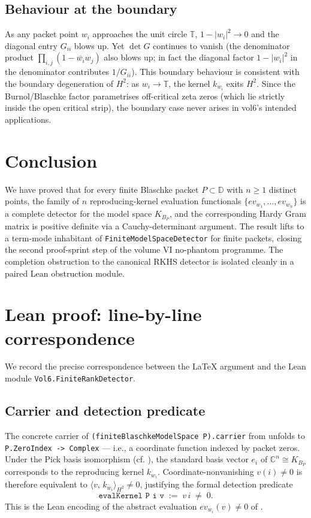 \documentclass[12pt]{article}
\theoremstyle{definition}
\theoremstyle{remark}
\newcommand{\C}{\mathbb{C}}
\newcommand{\D}{\mathbb{D}}
\newcommand{\T}{\mathbb{T}}
\newcommand{\HHH}{H^{2}}
\newcommand{\KBP}{K_{B_{P}}}
\newcommand{\inner}[2]{\langle #1,\,#2\rangle}
\newcommand{\abs}[1]{\lvert #1 \rvert}
\newcommand{\conj}[1]{\overline{#1}}
\begin{document}
\subsection{Behaviour at the boundary}

As any packet point $w_{i}$ approaches the unit circle $\T$,
$1-\abs{w_{i}}^{2}\to0$ and the diagonal entry $G_{ii}$ blows up. Yet
$\det G$ continues to vanish (the denominator product
$\prod_{i,j}(1-\conj{w_{i}}w_{j})$ also blows up; in fact the diagonal
factor $1-\abs{w_{i}}^{2}$ in the denominator contributes $1/G_{ii}$).
This boundary behaviour is consistent with the boundary degeneration of
$\HHH$: as $w_{i}\to\T$, the kernel $k_{w_{i}}$ exits $\HHH$. Since the
Burnol/Blaschke factor parametrises off-critical zeta zeros (which lie
strictly inside the open critical strip), the boundary case never arises
in vol6's intended applications.

\section{Conclusion}\label{sec:conclusion}

We have proved that for every finite Blaschke packet $P\subset\D$ with
$n\ge1$ distinct points, the family of $n$ reproducing-kernel evaluation
functionals $\{ev_{w_{1}},\dots,ev_{w_{n}}\}$ is a complete detector for
the model space $\KBP$, and the corresponding Hardy Gram matrix is
positive definite via a Cauchy-determinant argument. The result lifts to
a term-mode inhabitant of \texttt{FiniteModelSpaceDetector} for finite
packets, closing the second proof-sprint step of the volume VI no-phantom
programme. The completion obstruction to the canonical RKHS detector is
isolated cleanly in a paired Lean obstruction module.

\appendix

\section{Lean proof: line-by-line correspondence}\label{app:lean-proof}

We record the precise correspondence between the LaTeX argument and the
Lean module \texttt{Vol6.FiniteRankDetector}.

\subsection{Carrier and detection predicate}

The concrete carrier of \texttt{(finiteBlaschkeModelSpace P).carrier} from
\cite[Paper~01]{Vol6KB} unfolds to \texttt{P.ZeroIndex -> Complex} —
i.e., a coordinate function indexed by packet zeros. Under the Pick
basis isomorphism (cf. ), the standard basis
vector $e_{i}$ of $\C^{n}\cong\KBP$ corresponds to the reproducing
kernel $k_{w_{i}}$. Coordinate-nonvanishing $v(i)\neq0$ is therefore
equivalent to $\inner{v}{k_{w_{i}}}_{\HHH}\neq0$, justifying the
formal detection predicate
\[
  \texttt{evalKernel P i v}\;:=\;v\,i\;\neq\;0.
\]
This is the Lean encoding of the abstract evaluation
$ev_{w_{i}}(v)\neq0$ of .
\end{document}
